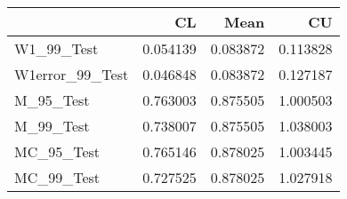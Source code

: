 \begin{tabular}{lrrr}
\toprule
{} &        CL &      Mean &        CU \\
\midrule
W1\_99\_Test      &  0.054139 &  0.083872 &  0.113828 \\
W1error\_99\_Test &  0.046848 &  0.083872 &  0.127187 \\
M\_95\_Test       &  0.763003 &  0.875505 &  1.000503 \\
M\_99\_Test       &  0.738007 &  0.875505 &  1.038003 \\
MC\_95\_Test      &  0.765146 &  0.878025 &  1.003445 \\
MC\_99\_Test      &  0.727525 &  0.878025 &  1.027918 \\
\bottomrule
\end{tabular}
